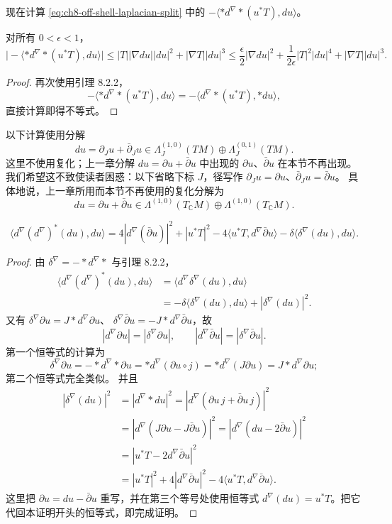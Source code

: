 现在计算 \eqref{eq:ch8-off-shell-laplacian-split} 中的
$-\langle*d^\nabla*(u^*T),du\rangle$。

\begin{lemma}\label{lem:ch8-torsion-error-estimate}
对所有 $0<\epsilon<1$，
\[
 \bigl|-\langle*d^\nabla*(u^*T),du\rangle\bigr|
 \leq |T||\nabla du||du|^2+|\nabla T||du|^3
 \leq\frac\epsilon2|\nabla du|^2+\frac1{2\epsilon}|T|^2|du|^4
      +|\nabla T||du|^3.
\]
\end{lemma}
\begin{proof}
再次使用引理 8.2.2，
\[
 -\langle*d^\nabla*(u^*T),du\rangle
 =-\langle d^\nabla*(u^*T),*du\rangle,
\]
直接计算即得不等式。
\end{proof}

以下计算使用分解
\[
 du=\partial_Ju+\bar\partial_Ju\in
 \Lambda_J^{(1,0)}(TM)\oplus\Lambda_J^{(0,1)}(TM).
\]
这里不使用复化；上一章分解 $du=\partial u+\bar\partial u$ 中出现的 $\partial u$、$\bar\partial u$ 在本节不再出现。我们希望这不致使读者困惑：以下省略下标 $J$，径写作
$\partial_Ju=\partial u$、$\bar\partial_Ju=\bar\partial u$。
具体地说，上一章所用而本节不再使用的复化分解为
\[
 du=\partial u+\bar\partial u\in
 \Lambda^{(1,0)}(T_\mathbb C M)\oplus\Lambda^{(1,0)}(T_\mathbb C M).
\]

\begin{lemma}\label{lem:ch8-delta-du-decomposition}
\[
 \langle d^\nabla(d^\nabla)^*(du),du\rangle
 =4|d^\nabla(\bar\partial u)|^2+|u^*T|^2
 -4\langle u^*T,d^\nabla\bar\partial u\rangle
 -\delta\langle\delta^\nabla(du),du\rangle.
\]
\end{lemma}
\begin{proof}
由 $\delta^\nabla=-*d^\nabla*$ 与引理 8.2.2，
\begin{align*}
 \langle d^\nabla(d^\nabla)^*(du),du\rangle
 &=\langle d^\nabla\delta^\nabla(du),du\rangle\\
 &=-\delta\langle\delta^\nabla(du),du\rangle+|\delta^\nabla(du)|^2.
\end{align*}
又有 $\delta^\nabla\partial u=J*d^\nabla\partial u$、
$\delta^\nabla\bar\partial u=-J*d^\nabla\bar\partial u$，故
\begin{equation}
 |d^\nabla\partial u|=|\delta^\nabla\partial u|,\qquad
 |d^\nabla\bar\partial u|=|\delta^\nabla\bar\partial u|.
 \label{eq:ch8-d-delta-partial}
\end{equation}
第一个恒等式的计算为
\[
 \delta^\nabla\partial u=-*d^\nabla*\partial u
 =*d^\nabla(\partial u\circ j)=*d^\nabla(J\partial u)
 =J*d^\nabla\partial u;
\]
第二个恒等式完全类似。
并且
\begin{align*}
 |\delta^\nabla(du)|^2
 &=|d^\nabla*du|^2
 =|d^\nabla(\partial u\,j+\bar\partial u\,j)|^2\\
 &=|d^\nabla(J\partial u-J\bar\partial u)|^2
 =|d^\nabla(du-2\bar\partial u)|^2\\
 &=|u^*T-2d^\nabla\bar\partial u|^2\\
 &=|u^*T|^2+4|d^\nabla\bar\partial u|^2
 -4\langle u^*T,d^\nabla\bar\partial u\rangle.
\end{align*}
这里把 $\partial u=du-\bar\partial u$ 重写，并在第三个等号处使用恒等式
$d^\nabla(du)=u^*T$。把它代回本证明开头的恒等式，即完成证明。
\end{proof}

